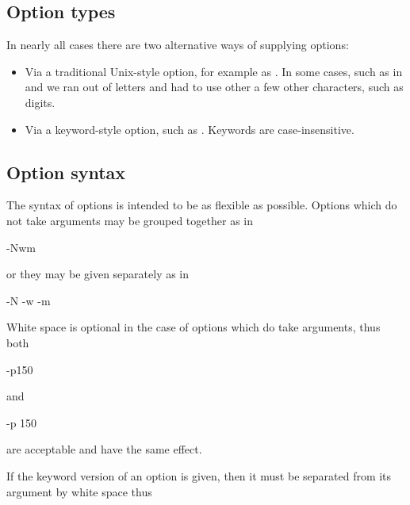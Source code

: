 \subsection{Option types}
In nearly all cases there are two alternative ways of supplying options:

\begin{itemize}
\item Via a traditional Unix-style  option, for example as . In some cases, such as in \PrBtr{} and
\PrBtjchange{} we ran out of letters and had to use other a few other characters, such as digits.
\item Via a keyword-style option, such as . Keywords are case-insensitive.
\end{itemize}
\subsection{Option syntax}
The syntax of options is intended to be as flexible as possible. Options which do not take arguments may be grouped together as in

\begin{expara}

{}-Nwm

\end{expara}

or they may be given separately as in

\begin{expara}

{}-N -w -m

\end{expara}

White space is optional in the case of options which do take arguments, thus both

\begin{expara}

{}-p150

\end{expara}

and

\begin{expara}

{}-p 150

\end{expara}

are acceptable and have the same effect.

If the keyword version of an option is given, then it must be separated from its argument by white space thus

